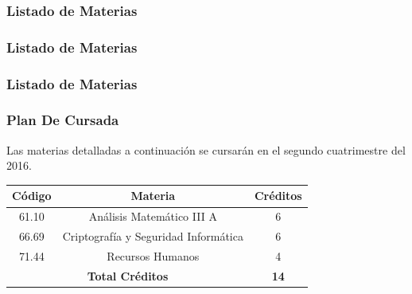 \documentclass[a4paper,10pt]{article}
\begin{document}
    \newpage
    \subsubsection{Listado de Materias}
        

    \newpage
     

    \newpage
    \subsubsection{Listado de Materias}
        

    \newpage
     
    

    \newpage
    \subsubsection{Listado de Materias}
        

    \newpage
    \subsubsection{Plan De Cursada}
        Las materias detalladas a continuación se cursarán en el segundo cuatrimestre del 2016.
        \begin{center}
            \begin{tabular}{|c|c|c|}
                \hline
                \textbf{Código} & \textbf{Materia} & \textbf{Créditos} \\
                \hline
                61.10 & Análisis Matemático III A & 6 \\
                \hline
                66.69 & Criptografía y Seguridad Informática  & 6 \\
                \hline
                71.44 & Recursos Humanos & 4 \\
                \hline
                \multicolumn{2}{|c|}{\textbf{Total Créditos}} & \textbf{14} \\
                \hline
            \end{tabular}
        \end{center}
    \newpage
    {}
    
\end{document}
